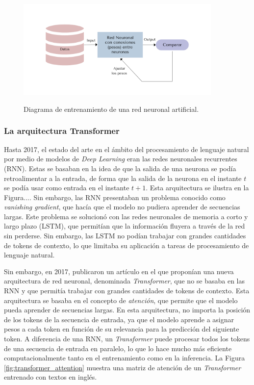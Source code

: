 \begin{figure}[H]
    \caption[Diagrama de entrenamiento de una red neuronal artificial]{Diagrama de entrenamiento de una red neuronal artificial.}
    \centering
    \includegraphics[width=0.9\textwidth]{./figuras/ann_training.png}
    \label{fig:ann_training}
\end{figure}

\subsubsection{La arquitectura Transformer}
Hasta 2017, el estado del arte en el ámbito del procesamiento de lenguaje natural por medio de modelos de \textit{Deep Learning} eran las redes neuronales recurrentes (RNN). Estas se basaban en la idea de que la salida de una neurona se podía retroalimentar a la entrada, de forma que la salida de la neurona en el instante $t$ se podía usar como entrada en el instante $t+1$. Esta arquitectura se ilustra en la Figura.... Sin embargo, las RNN presentaban un problema conocido como \textit{vanishing gradient}, que hacía que el modelo no pudiera aprender de secuencias largas. Este problema se solucionó con las redes neuronales de memoria a corto y largo plazo (LSTM), que permitían que la información fluyera a través de la red sin perderse. Sin embargo, las LSTM no podían trabajar con grandes cantidades de tokens de contexto, lo que limitaba su aplicación a tareas de procesamiento de lenguaje natural.

Sin embargo, en 2017, \citeauthor{vaswaniAttentionAllYou2017} publicaron un artículo \citep{vaswaniAttentionAllYou2017} en el que proponían una nueva arquitectura de red neuronal, denominada \textit{Transformer}, que no se basaba en las RNN y que permitía trabajar con grandes cantidades de tokens de contexto. Esta arquitectura se basaba en el concepto de \textit{atención}, que permite que el modelo pueda aprender de secuencias largas. En esta arquitectura, no importa la posición de los tokens de la secuencia de entrada, ya que el modelo aprende a asignar pesos a cada token en función de su relevancia para la predicción del siguiente token. A diferencia de una RNN, un \textit{Transformer} puede procesar todos los tokens de una secuencia de entrada en paralelo, lo que lo hace mucho más eficiente computacionalmente tanto en el entrenamiento como en la inferencia. La Figura \ref{fig:transformer_attention} muestra una matriz de atención de un \textit{Transformer} entrenado con textos en inglés.

